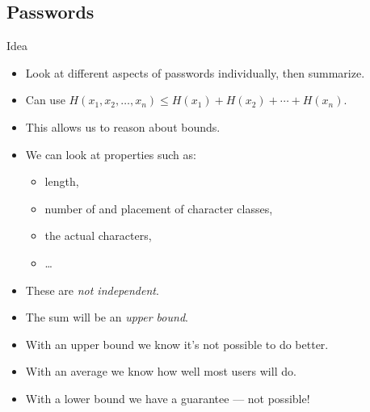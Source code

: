 \subsection{Passwords}

\begin{frame}
  \begin{block}{Idea~\cite{Komanduri2011opa}}
    \begin{itemize}
      \item Look at different aspects of passwords individually, then 
        summarize.
      \item Can use \(H(x_1, x_2, \ldots, x_n) \leq H(x_1) + H(x_2) + \cdots 
          + H(x_n)\).
      \item This allows us to reason about bounds.
    \end{itemize}
  \end{block}
\end{frame}

\begin{frame}
  \begin{example}
    \begin{itemize}
      \item We can look at properties such as:
        \begin{itemize}
          \item length,
          \item number of and placement of character classes,
          \item the actual characters,
          \item \dots
        \end{itemize}
    \end{itemize}
  \end{example}

  \pause{}

  \begin{remark}
    \begin{itemize}
      \item These are \emph{not independent}.
      \item The sum will be an \emph{upper bound}.
    \end{itemize}
  \end{remark}
\end{frame}

\begin{frame}
  \begin{remark}
    \begin{itemize}
      \item With an upper bound we know it's not possible to do better.
      \item With an average we know how well most users will do.
      \item With a lower bound we have a guarantee --- not possible!
    \end{itemize}
  \end{remark}
\end{frame}

